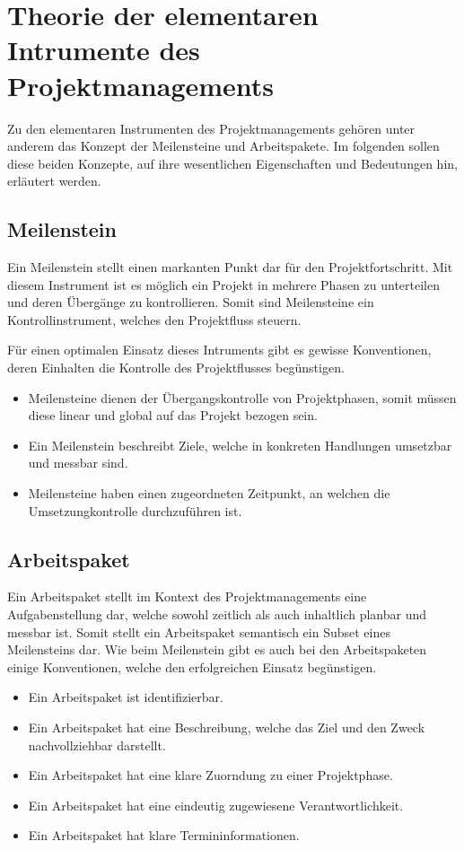 \section{Theorie der elementaren Intrumente des Projektmanagements}
Zu den elementaren Instrumenten des Projektmanagements gehören unter
anderem das Konzept der Meilensteine und Arbeitspakete. Im folgenden
sollen diese beiden Konzepte, auf ihre wesentlichen Eigenschaften und
Bedeutungen hin, erläutert werden.

\subsection{Meilenstein}
Ein Meilenstein stellt einen markanten Punkt dar für den
Projektfortschritt. Mit diesem Instrument ist es möglich ein Projekt
in mehrere Phasen zu unterteilen und deren Übergänge zu kontrollieren.
Somit sind Meilensteine ein Kontrollinstrument, welches den
Projektfluss steuern.

Für einen optimalen Einsatz dieses Intruments gibt es gewisse
Konventionen, deren Einhalten die Kontrolle des Projektflusses
begünstigen.

\begin{itemize}
	\item Meilensteine dienen der Übergangskontrolle von
		Projektphasen, somit müssen diese linear und
		global auf das Projekt bezogen sein.
	\item Ein Meilenstein beschreibt Ziele, welche in konkreten
		Handlungen umsetzbar und messbar sind.
	\item Meilensteine haben einen zugeordneten Zeitpunkt, an
		welchen die Umsetzungkontrolle durchzuführen ist.
\end{itemize}

\subsection{Arbeitspaket}
Ein Arbeitspaket stellt im Kontext des Projektmanagements eine
Aufgabenstellung dar, welche sowohl zeitlich als auch inhaltlich
planbar und messbar ist. Somit stellt ein Arbeitspaket semantisch ein
Subset eines Meilensteins dar. Wie beim Meilenstein gibt es auch bei
den Arbeitspaketen einige Konventionen, welche den erfolgreichen
Einsatz begünstigen.

\begin{itemize}
	\item Ein Arbeitspaket ist identifizierbar.
	\item Ein Arbeitspaket hat eine Beschreibung, welche das Ziel
		und den Zweck nachvollziehbar darstellt.
	\item Ein Arbeitspaket hat eine klare Zuorndung zu einer
		Projektphase.
	\item Ein Arbeitspaket hat eine eindeutig zugewiesene
		Verantwortlichkeit.
	\item Ein Arbeitspaket hat klare Termininformationen.
\end{itemize}
